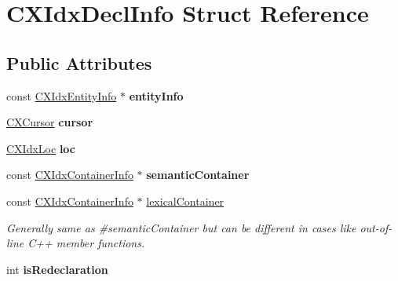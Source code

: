 \hypertarget{structCXIdxDeclInfo}{}\section{C\+X\+Idx\+Decl\+Info Struct Reference}
\label{structCXIdxDeclInfo}
\subsection*{Public Attributes}
\begin{DoxyCompactItemize}
\item 
\mbox{\label{structCXIdxDeclInfo_a9baf19d381db4ef1b781dde00c71f491}} 
const \mbox{\hyperlink{structCXIdxEntityInfo}{C\+X\+Idx\+Entity\+Info}} $\ast$ {\bfseries entity\+Info}
\item 
\mbox{\label{structCXIdxDeclInfo_ada4e8160cc0c3e9f720e7bd212a739a2}} 
\mbox{\hyperlink{structCXCursor}{C\+X\+Cursor}} {\bfseries cursor}
\item 
\mbox{\label{structCXIdxDeclInfo_a89fec7990b7c494334c3ec0f1923a5fe}} 
\mbox{\hyperlink{structCXIdxLoc}{C\+X\+Idx\+Loc}} {\bfseries loc}
\item 
\mbox{\label{structCXIdxDeclInfo_a5187651353934832d8616a5d7adb9aa5}} 
const \mbox{\hyperlink{structCXIdxContainerInfo}{C\+X\+Idx\+Container\+Info}} $\ast$ {\bfseries semantic\+Container}
\item 
\mbox{\label{structCXIdxDeclInfo_aef123dde6713b5fe4af3b1715c9636ca}} 
const \mbox{\hyperlink{structCXIdxContainerInfo}{C\+X\+Idx\+Container\+Info}} $\ast$ \mbox{\hyperlink{structCXIdxDeclInfo_aef123dde6713b5fe4af3b1715c9636ca}{lexical\+Container}}
\begin{DoxyCompactList}\small\item\em Generally same as \#semantic\+Container but can be different in cases like out-\/of-\/line C++ member functions. \end{DoxyCompactList}\item 
\mbox{\label{structCXIdxDeclInfo_a7958178e9e6dfa3f88ff87132e827636}} 
int {\bfseries is\+Redeclaration}
\item 
\mbox{\label{structCXIdxDeclInfo_a925e7e3dca5356fdd7d5491a77f79dad}} 

\end{DoxyCompactItemize}

